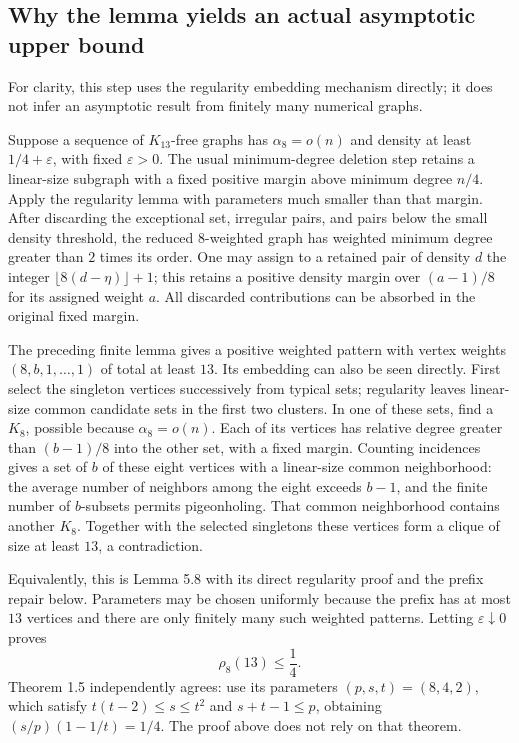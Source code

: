 \documentclass[10pt]{article}
\begin{document}
\subsection*{Why the lemma yields an actual asymptotic upper bound}
For clarity, this step uses the regularity embedding mechanism directly; it does not infer an asymptotic result from finitely many numerical graphs.\par
Suppose a sequence of \(K_{13}\)-free graphs has \(\alpha_8=o(n)\) and density at least \(1/4+\varepsilon\), with fixed \(\varepsilon>0\). The usual minimum-degree deletion step retains a linear-size subgraph with a fixed positive margin above minimum degree \(n/4\). Apply the regularity lemma with parameters much smaller than that margin. After discarding the exceptional set, irregular pairs, and pairs below the small density threshold, the reduced \(8\)-weighted graph has weighted minimum degree greater than \(2\) times its order. One may assign to a retained pair of density \(d\) the integer \(\lfloor8(d-\eta)\rfloor+1\); this retains a positive density margin over \((a-1)/8\) for its assigned weight \(a\). All discarded contributions can be absorbed in the original fixed margin.\par
The preceding finite lemma gives a positive weighted pattern with vertex weights \((8,b,1,\ldots,1)\) of total at least \(13\). Its embedding can also be seen directly. First select the singleton vertices successively from typical sets; regularity leaves linear-size common candidate sets in the first two clusters. In one of these sets, find a \(K_8\), possible because \(\alpha_8=o(n)\). Each of its vertices has relative degree greater than \((b-1)/8\) into the other set, with a fixed margin. Counting incidences gives a set of \(b\) of these eight vertices with a linear-size common neighborhood: the average number of neighbors among the eight exceeds \(b-1\), and the finite number of \(b\)-subsets permits pigeonholing. That common neighborhood contains another \(K_8\). Together with the selected singletons these vertices form a clique of size at least \(13\), a contradiction.\par
Equivalently, this is Lemma 5.8 with its direct regularity proof and the prefix repair below. Parameters may be chosen uniformly because the prefix has at most \(13\) vertices and there are only finitely many such weighted patterns. Letting \(\varepsilon\downarrow0\) proves \[\boxed{\rho_8(13)\leq\frac14.}\] Theorem 1.5 independently agrees: use its parameters \((p,s,t)=(8,4,2)\), which satisfy \(t(t-2)\leq s\leq t^2\) and \(s+t-1\leq p\), obtaining \((s/p)(1-1/t)=1/4\). The proof above does not rely on that theorem.\par
\end{document}
